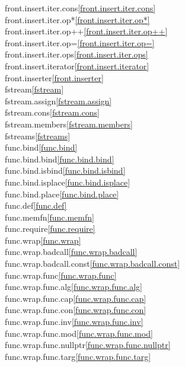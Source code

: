 \begin{multicols}{2}
front.insert.iter.cons\quad\ref{front.insert.iter.cons}\\
front.insert.iter.op*\quad\ref{front.insert.iter.op*}\\
front.insert.iter.op++\quad\ref{front.insert.iter.op++}\\
front.insert.iter.op=\quad\ref{front.insert.iter.op=}\\
front.insert.iter.ops\quad\ref{front.insert.iter.ops}\\
front.insert.iterator\quad\ref{front.insert.iterator}\\
front.inserter\quad\ref{front.inserter}\\
fstream\quad\ref{fstream}\\
fstream.assign\quad\ref{fstream.assign}\\
fstream.cons\quad\ref{fstream.cons}\\
fstream.members\quad\ref{fstream.members}\\
fstreams\quad\ref{fstreams}\\
func.bind\quad\ref{func.bind}\\
func.bind.bind\quad\ref{func.bind.bind}\\
func.bind.isbind\quad\ref{func.bind.isbind}\\
func.bind.isplace\quad\ref{func.bind.isplace}\\
func.bind.place\quad\ref{func.bind.place}\\
func.def\quad\ref{func.def}\\
func.memfn\quad\ref{func.memfn}\\
func.require\quad\ref{func.require}\\
func.wrap\quad\ref{func.wrap}\\
func.wrap.badcall\quad\ref{func.wrap.badcall}\\
func.wrap.badcall.const\quad\ref{func.wrap.badcall.const}\\
func.wrap.func\quad\ref{func.wrap.func}\\
func.wrap.func.alg\quad\ref{func.wrap.func.alg}\\
func.wrap.func.cap\quad\ref{func.wrap.func.cap}\\
func.wrap.func.con\quad\ref{func.wrap.func.con}\\
func.wrap.func.inv\quad\ref{func.wrap.func.inv}\\
func.wrap.func.mod\quad\ref{func.wrap.func.mod}\\
func.wrap.func.nullptr\quad\ref{func.wrap.func.nullptr}\\
func.wrap.func.targ\quad\ref{func.wrap.func.targ}\\

\end{multicols}
